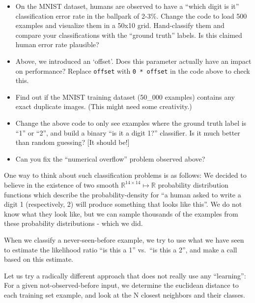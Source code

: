 \documentclass[11pt]{article}
\begin{document}
\begin{itemize}
\item
  On the MNIST dataset, humans are observed to have a ``which digit is
  it'' classification error rate in the ballpark of 2-3\%. Change the
  code to load 500 examples and visualize them in a 50x10 grid.
  Hand-classify them and compare your classifications with the ``ground
  truth'' labels. Is this claimed human error rate plausible?
\item
  Above, we introduced an `offset'. Does this parameter actually have an
  impact on performance? Replace \texttt{offset} with
  \texttt{0\ *\ offset} in the code above to check this.
\item
  Find out if the MNIST training dataset (50\_000 examples) contains any
  exact duplicate images. (This might need some creativity.)
\item
  Change the above code to only see examples where the ground truth
  label is ``1'' or ``2'', and build a binary ``is it a digit 1?''
  classifier. Is it much better than random guessing? {[}It should
  be!{]}
\item
  Can you fix the ``numerical overflow'' problem observed above?
\end{itemize}

    One way to think about such classification problems is as follows: We
decided to believe in the existence of two smooth
\({\mathbb R}^{14\times 14}\mapsto{\mathbb R}\) probability distribution
functions which describe the probability-density for ``a human asked to
write a digit 1 (respectively, 2) will produce something that looks like
this''. We do not know what they look like, but we can sample thousands
of the examples from these probability distributions - which we did.

When we classify a never-seen-before example, we try to use what we have
seen to estimate the likelihood ratio ``is this a 1'' vs.~``is this a
2'', and make a call based on this estimate.

Let us try a radically different approach that does not really use any
``learning'': For a given not-observed-before input, we determine the
euclidean distance to each training set example, and look at the N
closest neighbors and their classes.
\end{document}
